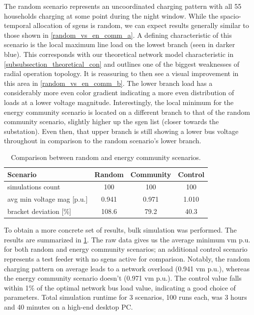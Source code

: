 \documentclass[a4paper,10pt]{report}
\begin{document}
The random scenario represents an uncoordinated charging pattern with all 55 households charging at some point during the night window. While the spacio-temporal allocation of sgens is random, we can expect results generally similar to those shown in \cref{random_vs_en_comm_a}. A defining characteristic of this scenario is the local maximum line load on the lowest branch (seen in darker blue). This corresponds with our theoretical network model characteristic in \cref{subsubsection_theoretical_con} and outlines one of the biggest weaknesses of radial operation topology. It is reassuring to then see a visual improvement in this area in \cref{random_vs_en_comm_b}. The lower branch load has a considerably more even color gradient indicating a more even distribution of loads at a lower voltage magnitude. Interestingly, the local minimum for the energy community scenario is located on a different branch to that of the random community scenario, slightly higher up the sgen list (closer towards the substation). Even then, that upper branch is still showing a lower bus voltage throughout in comparison to the random scenario's lower branch.

\begin{table}[htpb]
	\centering
	\begin{tabular}{lccc}
		\toprule
		Scenario & Random & Community & Control \\
		\midrule
		simulations count & 100 & 100 & 100 \\
		avg min voltage mag [p.u.] & 0.941 & 0.971 & 1.010 \\
		bracket deviation [\%] & 108.6 & 79.2 & 40.3 \\
		\bottomrule
	\end{tabular}
	\caption[Comparison between random and energy community scenarios]{Comparison between random and energy community scenarios.}
	\label{table_random_vs_comm}
\end{table}

To obtain a more concrete set of results, bulk simulation was performed. The results are summarized in \cref{table_random_vs_comm}. The raw data gives us the average minimum vm p.u. for both random and energy community scenarios; an additional control scenario represents a test feeder with no sgens active for comparison. Notably, the random charging pattern on average leads to a network overload (0.941 vm p.u.), whereas the energy community scenario doesn't (0.971 vm p.u.). The control value falls within 1\% of the optimal network bus load value, indicating a good choice of parameters. Total simulation runtime for 3 scenarios, 100 runs each, was 3 hours and 40 minutes on a high-end desktop PC.
\end{document}
